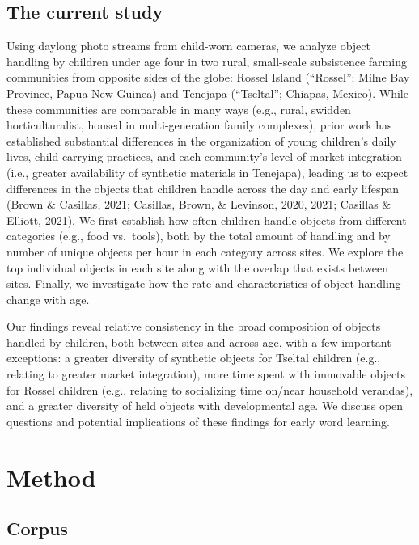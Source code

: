\documentclass[10pt, letterpaper]{article}
\begin{document}
\hypertarget{the-current-study}{%
\subsection{The current study}\label{the-current-study}}

Using daylong photo streams from child-worn cameras, we analyze object
handling by children under age four in two rural, small-scale
subsistence farming communities from opposite sides of the globe: Rossel
Island (``Rossel''; Milne Bay Province, Papua New Guinea) and Tenejapa
(``Tseltal''; Chiapas, Mexico). While these communities are comparable
in many ways (e.g., rural, swidden horticulturalist, housed in
multi-generation family complexes), prior work has established
substantial differences in the organization of young children's daily
lives, child carrying practices, and each community's level of market
integration (i.e., greater availability of synthetic materials in
Tenejapa), leading us to expect differences in the objects that children
handle across the day and early lifespan (Brown \& Casillas, 2021;
Casillas, Brown, \& Levinson, 2020, 2021; Casillas \& Elliott, 2021). We
first establish how often children handle objects from different
categories (e.g., food vs.~tools), both by the total amount of handling
and by number of unique objects per hour in each category across sites.
We explore the top individual objects in each site along with the
overlap that exists between sites. Finally, we investigate how the rate
and characteristics of object handling change with age.

Our findings reveal relative consistency in the broad composition of
objects handled by children, both between sites and across age, with a
few important exceptions: a greater diversity of synthetic objects for
Tseltal children (e.g., relating to greater market integration), more
time spent with immovable objects for Rossel children (e.g., relating to
socializing time on/near household verandas), and a greater diversity of
held objects with developmental age. We discuss open questions and
potential implications of these findings for early word learning.

\hypertarget{method}{%
\section{Method}\label{method}}

\hypertarget{corpus}{%
\subsection{Corpus}\label{corpus}}
\end{document}
